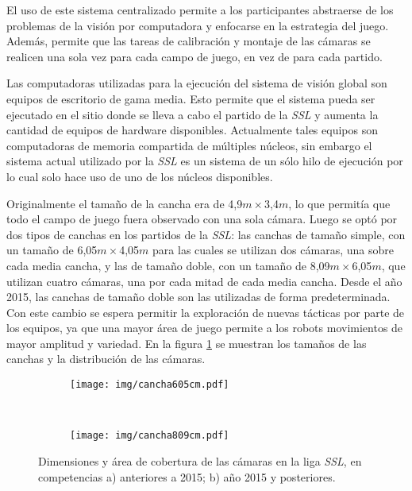 El uso de este sistema centralizado permite a los participantes abstraerse de
los problemas de la visión por computadora y enfocarse en la estrategia del
juego. Además, permite que las tareas de calibración y montaje de las cámaras se
realicen una sola vez para cada campo de juego, en vez de para cada partido.

Las computadoras utilizadas para la ejecución del sistema de visión global son
equipos de escritorio de gama media. Esto permite que el sistema pueda ser
ejecutado en el sitio donde se lleva a cabo el partido de la \emph{SSL} y
aumenta la cantidad de equipos de hardware disponibles. Actualmente tales
equipos son computadoras de memoria compartida de múltiples núcleos, sin
embargo el sistema actual utilizado por la \emph{SSL} es un sistema de un sólo
hilo de ejecución por lo cual solo hace uso de uno de los núcleos disponibles.

Originalmente el tamaño de la cancha era de 4,9$m\times$3,4$m$, lo que
permitía que todo el campo de juego fuera observado con una sola cámara. Luego
se optó por dos tipos de canchas en los partidos de la \emph{SSL}: las canchas
de tamaño simple, con un tamaño de 6,05$m\times$4,05$m$ para las cuales se
utilizan dos cámaras, una sobre cada media cancha, y las de tamaño doble, con
un tamaño de 8,09$m\times$6,05$m$, que utilizan cuatro cámaras, una por cada
mitad de cada media cancha. Desde el año 2015, las canchas de tamaño doble son
las utilizadas de forma predeterminada\cite{sslrules2015}. Con este cambio se
espera permitir la exploración de nuevas tácticas por parte de los equipos, ya
que una mayor área de juego permite a los robots movimientos de mayor amplitud
y variedad. En la figura \ref{cancha} se muestran los tamaños de las canchas y
la distribución de las cámaras.

\begin{figure}[!h]

	\centering

	\begin{subfigure}{0.45\textwidth}
		\centering
		\texttt{[image: img/cancha605cm.pdf]}
		\caption{}
	\end{subfigure}
	~
	\begin{subfigure}{0.45\textwidth}
		\centering
		\texttt{[image: img/cancha809cm.pdf]}
		\caption{}
	\end{subfigure}

	\caption{Dimensiones y área de cobertura de las cámaras en la liga
	\emph{SSL}, en competencias a) anteriores a 2015; b) año 2015 y
	posteriores.}

	\label{cancha}

\end{figure}

